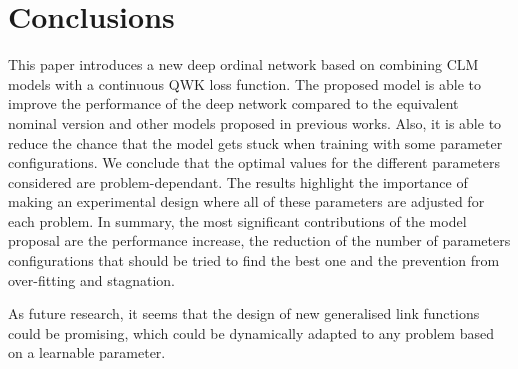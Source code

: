 \documentclass[journal]{IEEEtran}
\begin{document}
	\section{Conclusions}
	\label{sect:conclusions} 
	This paper introduces a new deep ordinal network based on combining CLM models with a continuous QWK loss function. The proposed model is able to improve the performance of the deep network compared to the equivalent nominal version and other models proposed in previous works. Also, it is able to reduce the chance that the model gets stuck when training with some parameter configurations. We conclude that the optimal values for the different parameters considered are problem-dependant. The results highlight the importance of making an experimental design where all of these parameters are adjusted for each problem. In summary, the most significant contributions of the model proposal are the performance increase, the reduction of the number of parameters configurations that should be tried to find the best one and the prevention from over-fitting and stagnation.
	
	As future research, it seems that the design of new generalised link functions could be promising, which could be dynamically adapted to any problem based on a learnable parameter. 
	
	

	
	
	
\end{document}
